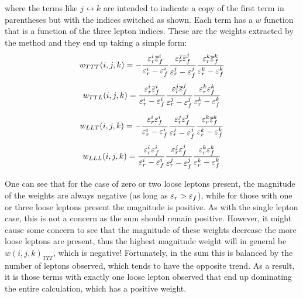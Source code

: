where the terms like $j\leftrightarrow k$ are intended to indicate
a copy of the first term in parentheses but with the indices 
switched as shown. Each term has a $w$ function that is a function
of the three lepton indices. These are the weights
extracted by the method and they end up taking a simple form:
\begin{equation}
\label{eq:mxm_wttt}
w_{TTT}(i,j,k) = 
-\frac{\varepsilon_r^i\overline{\varepsilon}_f^i}{\varepsilon_r^i-\varepsilon_f^i}
\frac{\varepsilon_r^j\overline{\varepsilon}_f^j}{\varepsilon_r^j-\varepsilon_f^j}
\frac{\varepsilon_r^k\overline{\varepsilon}_f^k}{\varepsilon_r^k-\varepsilon_f^k}
\end{equation}
\begin{equation}
\label{eq:mxm_wttl}
w_{TTL}(i,j,k) = 
\frac{\varepsilon_r^i\overline{\varepsilon}_f^i}{\varepsilon_r^i-\varepsilon_f^i}
\frac{\varepsilon_r^j\overline{\varepsilon}_f^j}{\varepsilon_r^j-\varepsilon_f^j}
\frac{\varepsilon_r^k\varepsilon_f^k}{\varepsilon_r^k-\varepsilon_f^k}
\end{equation}
\begin{equation}
\label{eq:mxm_wllt}
w_{LLT}(i,j,k) =  
- \frac{\varepsilon_r^i\varepsilon_f^i}{\varepsilon_r^i-\varepsilon_f^i}
\frac{\varepsilon_r^j\varepsilon_f^j}{\varepsilon_r^j-\varepsilon_f^j}
\frac{\varepsilon_r^k\overline{\varepsilon}_f^k}{\varepsilon_r^k-\varepsilon_f^k}
\end{equation}
\begin{equation}
\label{eq:mxm_wlll}
w_{LLL}(i,j,k) =  
\frac{\varepsilon_r^i\varepsilon_f^i}{\varepsilon_r^i-\varepsilon_f^i}
\frac{\varepsilon_r^j\varepsilon_f^j}{\varepsilon_r^j-\varepsilon_f^j}
\frac{\varepsilon_r^k\varepsilon_f^k}{\varepsilon_r^k-\varepsilon_f^k}
\end{equation}


One can see that for the case of zero or two loose leptons present, 
the magnitude of the weights are always negative (as long
as $\varepsilon_r > \varepsilon_f$), while for those with one or three loose leptons 
present the magnitude is positive. As with the single
lepton case, this is not a concern as the sum should remain positive.
However, it might cause some concern to see that 
the magnitude of these weights decrease the more loose leptons 
are present, thus the highest magnitude weight
will in general be $w(i,j,k)_{TTT}$, which is negative!
Fortunately, in the sum this is balanced by the number of 
leptons observed, which tends to have the opposite trend.
As a result, it is those terms with exactly one loose lepton
observed that end up dominating the entire calculation, which
has a positive weight. 

